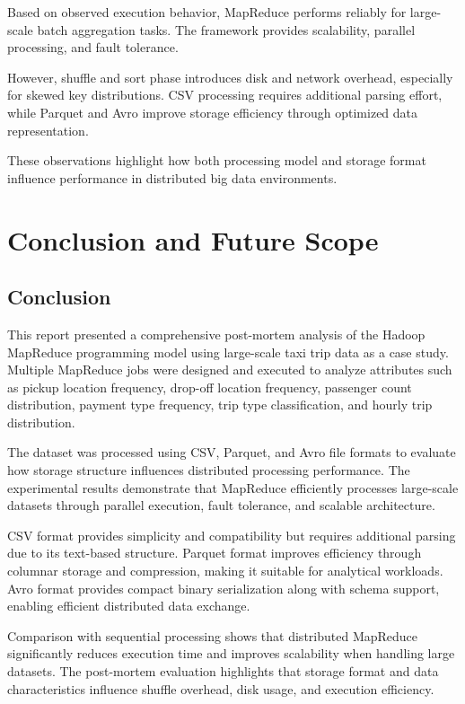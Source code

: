 \documentclass[12pt,a4paper]{report}
\begin{document}
Based on observed execution behavior, MapReduce performs reliably for large-scale
batch aggregation tasks. The framework provides scalability, parallel processing, and
fault tolerance.

However, shuffle and sort phase introduces disk and network overhead, especially for
skewed key distributions. CSV processing requires additional parsing effort, while Parquet
and Avro improve storage efficiency through optimized data representation.

These observations highlight how both processing model and storage format influence
performance in distributed big data environments.
\newpage
\section{Conclusion and Future Scope}

\subsection{Conclusion}

This report presented a comprehensive post-mortem analysis of the Hadoop MapReduce
programming model using large-scale taxi trip data as a case study. Multiple MapReduce
jobs were designed and executed to analyze attributes such as pickup location frequency,
drop-off location frequency, passenger count distribution, payment type frequency, trip
type classification, and hourly trip distribution.

The dataset was processed using CSV, Parquet, and Avro file formats to evaluate how
storage structure influences distributed processing performance. The experimental results
demonstrate that MapReduce efficiently processes large-scale datasets through parallel
execution, fault tolerance, and scalable architecture.

CSV format provides simplicity and compatibility but requires additional parsing due to
its text-based structure. Parquet format improves efficiency through columnar storage
and compression, making it suitable for analytical workloads. Avro format provides
compact binary serialization along with schema support, enabling efficient distributed
data exchange.

Comparison with sequential processing shows that distributed MapReduce significantly
reduces execution time and improves scalability when handling large datasets. The
post-mortem evaluation highlights that storage format and data characteristics influence
shuffle overhead, disk usage, and execution efficiency.
\end{document}
